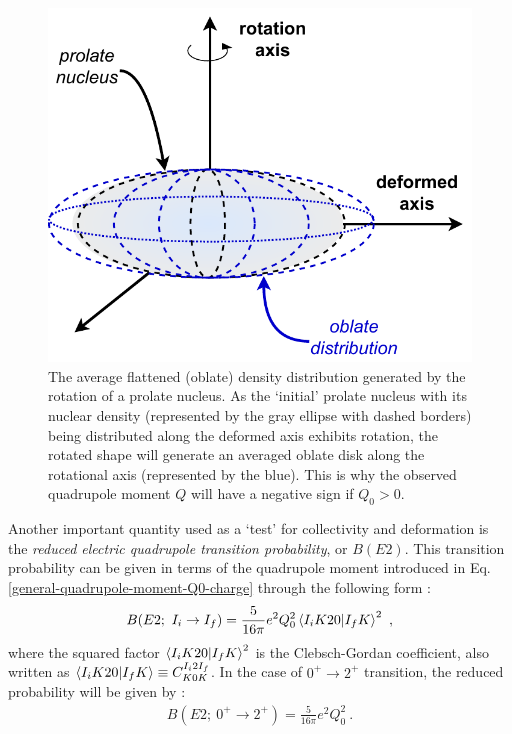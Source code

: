 \begin{figure}
    \centering
    \includegraphics[scale=0.7]{Chapters/Figures/averaged_nuclearMatter_prolate.pdf}
    \caption{The average flattened (oblate) density distribution generated by the rotation of a prolate nucleus. As the `initial' prolate nucleus with its nuclear density (represented by the gray ellipse with dashed borders) being distributed along the deformed axis exhibits rotation, the rotated shape will generate an averaged oblate disk along the rotational axis (represented by the blue). This is why the observed quadrupole moment $Q$ will have a negative sign if $Q_0>0$.}
    \label{fig-averaged-prolate-density}
\end{figure}

Another important quantity used as a `test' for collectivity and deformation is the \emph{reduced electric quadrupole transition probability}, or $B(E2)$. This transition probability can be given in terms of the quadrupole moment introduced in Eq. \ref{general-quadrupole-moment-Q0-charge} through the following form \cite{bohr1998nuclear}:
\begin{align}
    B(E2;\ I_i\to I_f)=\frac{5}{16\pi}e^2Q_0^2\bra{I_iK20}\ket{I_fK}^2\ ,
    \label{reduced-E2-clebsch-gordan}
\end{align}
where the squared factor $\bra{I_iK20}\ket{I_fK}^2$ is the Clebsch-Gordan coefficient, also written as $\bra{I_iK20}\ket{I_fK}\equiv C^{I_i2I_f}_{K0K}$. In the case of $0^+\to 2^+$ transition, the reduced probability will be given by \cite{casten2000nuclear}:
\begin{align}
    B(E2;\ 0^+\to 2^+)=\frac{5}{16\pi}e^2Q_0^2\ .
    \label{reduced-E2-0Plus-2Plus-Transition}
\end{align}

